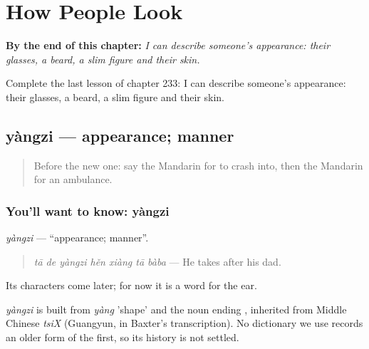 
\chapter{How People Look}
\label{ch:zh-how-people-look}

\begin{chapteropening}
\textbf{By the end of this chapter:} \emph{I can describe someone's appearance: their glasses, a beard, a slim figure and their skin.}

Complete the last lesson of chapter 233: I can describe someone's appearance: their glasses, a beard, a slim figure and their skin.
\end{chapteropening}

\section[yàngzi]{yàngzi — appearance; manner}

\label{lesson:ZH-C233-yangzi}



\begin{quote}
Before the new one: say the Mandarin for to crash into, then the Mandarin for an ambulance.
\end{quote}

\subsection*{You'll want to know: yàngzi}
\emph{yàngzi} — \textquotedblleft{}appearance; manner\textquotedblright{}.

\begin{quote}
\emph{tā de yàngzi hěn xiàng tā bàba} — He takes after his dad.
\end{quote}

Its characters come later; for now it is a word for the ear.

\begin{cousinweb}
\emph{yàngzi} is built from \emph{yàng} 'shape' and the noun ending , inherited from Middle Chinese \emph{tsiX} (Guangyun, in Baxter's transcription). No dictionary we use records an older form of the first, so its history is not settled.
\end{cousinweb}

